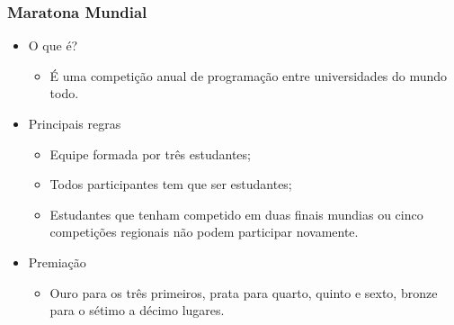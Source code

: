 \begin{frame}
  \frametitle{Maratona Mundial}
  \begin{itemize}
    \item O que é?
    \begin{itemize}
      \item É uma competição anual de programação entre universidades do mundo todo.
    \end{itemize}
    \item Principais regras
    \begin{itemize}
      \item Equipe formada por três estudantes;
      \item Todos participantes tem que ser estudantes;
      \item Estudantes que tenham competido em duas finais mundias ou cinco competições regionais não podem participar novamente.
    \end{itemize}
    \item Premiação
    \begin{itemize}
      \item Ouro para os três primeiros, prata para quarto, quinto e sexto, bronze para o sétimo a décimo lugares.
    \end{itemize}
  \end{itemize}
\end{frame}